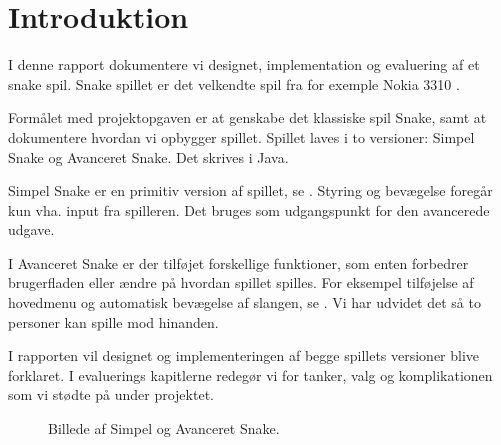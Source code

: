 \chapter{Introduktion}
I denne rapport dokumentere vi designet, implementation og evaluering af et snake spil. Snake spillet er det velkendte spil fra for exemple Nokia 3310 \cite{wiki_snake}. 

Formålet med projektopgaven er at genskabe det klassiske spil Snake, samt at dokumentere hvordan vi opbygger spillet. Spillet laves i to versioner: Simpel Snake og Avanceret Snake. Det skrives i Java.

Simpel Snake er en primitiv version af spillet, se . Styring og bevægelse foregår kun vha. input fra spilleren. Det bruges som udgangspunkt for den avancerede udgave.

I Avanceret Snake er der tilføjet forskellige funktioner, som enten forbedrer brugerfladen eller ændre på hvordan spillet spilles. For eksempel tilføjelse af hovedmenu og automatisk bevægelse af slangen, se . Vi har udvidet det så to personer kan spille mod hinanden.

I rapporten vil designet og implementeringen af begge spillets versioner blive forklaret. I evaluerings kapitlerne redegør vi for tanker, valg og komplikationen som vi stødte på under projektet. 

\begin{figure}[h]
	\centering
	\graphicspath{{pics/}}
	\hspace{0.1\textwidth}
	\caption{Billede af Simpel og Avanceret Snake.}
\end{figure}